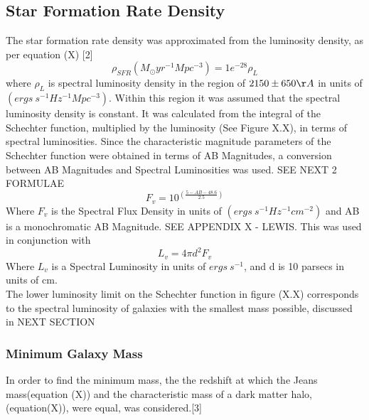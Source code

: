 \documentclass[pdf,color]{UoBnote}
\begin{document}

\subsection{Star Formation Rate Density}
The star formation rate density was approximated from the luminosity density, as per equation (X) [2]
\begin{equation}
\rho_{SFR}(M_\odot yr^{-1} Mpc^{-3})=1e^{-28} \rho_L 
\end{equation}
where $\rho_L$ is spectral luminosity density in the region of $2150\pm 650 \AA$ in units of $(ergs \ s^{-1} Hz^{-1} Mpc^{-3})$. Within this region it was assumed that the spectral luminosity density is constant. It was calculated from the integral of the Schechter function, multiplied by the luminosity (See Figure X.X), in terms of spectral luminosities. Since the characteristic magnitude parameters of the Schechter function were obtained in terms of AB Magnitudes, a conversion between AB Magnitudes and Spectral Luminosities was used. SEE NEXT 2 FORMULAE
\begin{equation}
F_v = 10^{\displaystyle\left (\frac{5-AB-48.6}{2.5}\right )} 
\end{equation}
Where $F_v$ is the Spectral Flux Density in units of $(ergs \ s^{-1} Hz^{-1} cm^{-2})$ and AB is a monochromatic AB Magnitude. SEE APPENDIX X - LEWIS. This was used in conjunction with
\begin{equation}
L_v=4\pi d^2 F_v
\end{equation} 
Where $L_v$ is a Spectral Luminosity in units of $ergs \ s^{-1}$, and d is 10 parsecs in units of cm. \\
\newline
The lower luminosity limit on the Schechter function in figure (X.X) corresponds to the spectral luminosity of galaxies with the smallest mass possible, discussed in NEXT SECTION
\subsubsection{Minimum Galaxy Mass}
In order to find the minimum mass, the the redshift at which the Jeans mass(equation (X)) and the characteristic mass of a dark matter halo, (equation(X)), were equal, was considered.[3]
\end{document}
